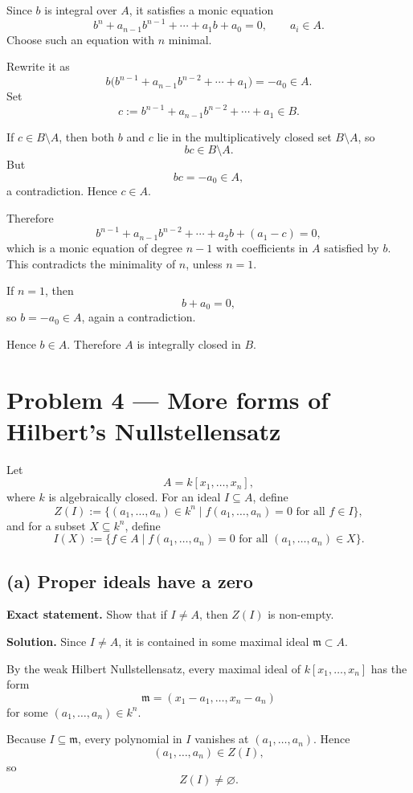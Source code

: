 \documentclass[12pt,a4paper]{article}
\theoremstyle{plain}
\theoremstyle{definition}      %
\begin{document}
Since \(b\) is integral over \(A\), it satisfies a monic equation
\[
b^n+a_{n-1}b^{n-1}+\cdots+a_1b+a_0=0,
\qquad a_i\in A.
\]
Choose such an equation with \(n\) minimal.

Rewrite it as
\[
b\bigl(b^{n-1}+a_{n-1}b^{n-2}+\cdots+a_1\bigr)=-a_0\in A.
\]
Set
\[
c:=b^{n-1}+a_{n-1}b^{n-2}+\cdots+a_1\in B.
\]

If \(c\in B\setminus A\), then both \(b\) and \(c\) lie in the multiplicatively closed set \(B\setminus A\), so
\[
bc\in B\setminus A.
\]
But
\[
bc=-a_0\in A,
\]
a contradiction. Hence \(c\in A\).

Therefore
\[
b^{n-1}+a_{n-1}b^{n-2}+\cdots+a_2b+(a_1-c)=0,
\]
which is a monic equation of degree \(n-1\) with coefficients in \(A\) satisfied by \(b\). This contradicts the minimality of \(n\), unless \(n=1\).

If \(n=1\), then
\[
b+a_0=0,
\]
so \(b=-a_0\in A\), again a contradiction.

Hence \(b\in A\). Therefore \(A\) is integrally closed in \(B\).

\bigskip

\section*{Problem 4 --- More forms of Hilbert's Nullstellensatz}

Let
\[
A=k[x_1,\dots,x_n],
\]
where \(k\) is algebraically closed. For an ideal \(I\subseteq A\), define
\[
Z(I):=\{(a_1,\dots,a_n)\in k^n\mid f(a_1,\dots,a_n)=0\text{ for all }f\in I\},
\]
and for a subset \(X\subseteq k^n\), define
\[
I(X):=\{f\in A\mid f(a_1,\dots,a_n)=0\text{ for all }(a_1,\dots,a_n)\in X\}.
\]

\subsection*{(a) Proper ideals have a zero}

\textbf{Exact statement.}
Show that if \(I\neq A\), then \(Z(I)\) is non-empty.

\textbf{Solution.}
Since \(I\neq A\), it is contained in some maximal ideal \(\mathfrak m\subset A\).

By the weak Hilbert Nullstellensatz, every maximal ideal of \(k[x_1,\dots,x_n]\) has the form
\[
\mathfrak m=(x_1-a_1,\dots,x_n-a_n)
\]
for some \((a_1,\dots,a_n)\in k^n\).

Because \(I\subseteq \mathfrak m\), every polynomial in \(I\) vanishes at \((a_1,\dots,a_n)\). Hence
\[
(a_1,\dots,a_n)\in Z(I),
\]
so
\[
Z(I)\neq\varnothing.
\]
\end{document}
